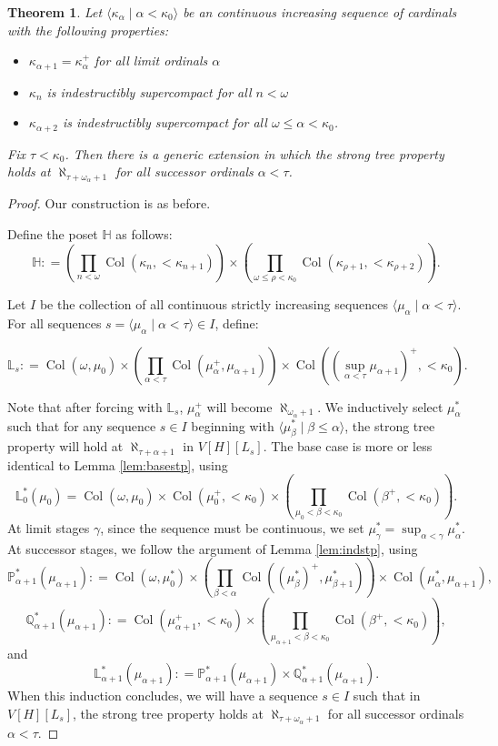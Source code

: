 \documentclass[psamsfonts]{amsart}
\newtheorem{thm}{Theorem}[section]
\theoremstyle{definition}
\newcommand{\defeq}{\mathrel{\mathop:}=}
\newcommand{\Q}{\mathbb{Q}}
\newcommand{\PP}{\mathbb{P}}
\newcommand{\LL}{\mathbb{L}}
\newcommand{\HH}{\mathbb{H}}
\newcommand{\ka}{\kappa}
\newcommand{\w}{\omega}
\DeclareMathOperator{\Coll}{Col}
\numberwithin{equation}{section}
\begin{document}
\begin{thm}
Let $\langle \ka_\alpha \mid \alpha < \ka_0\rangle$ be an continuous increasing sequence of cardinals with the following properties:
\begin{itemize}
	\item $\ka_{\alpha+1} = \ka_\alpha^+$ for all limit ordinals $\alpha$
	\item $\ka_n$ is indestructibly supercompact for all $n<\w$
	\item $\ka_{\alpha+2}$ is indestructibly supercompact for all $\w\leq \alpha < \ka_0$.
\end{itemize}

Fix $\tau < \ka_0$. Then there is a generic extension in which the strong tree property holds at $\aleph_{\tau+\w_\alpha+1}$ for all successor ordinals $\alpha < \tau$.
\end{thm}
\begin{proof}
	Our construction is as before.
	
	Define the poset $\HH$ as follows:
	\[\HH\defeq \left(\prod_{n<\w} \Coll(\ka_n, <\ka_{n+1})\right) \times \left( \prod_{\w\leq\rho<\ka_0} \Coll(\ka_{\rho+1}, <\ka_{\rho+2})\right).\]
	
	Let $I$ be the collection of all continuous strictly increasing sequences $\langle \mu_{\alpha} \mid \alpha < \tau\rangle$. For all sequences $s = \langle \mu_{\alpha} \mid \alpha < \tau\rangle\in I$, define:

	\[\LL_s \defeq \Coll(\w, \mu_0) \times \left( \prod_{\alpha < \tau } \Coll(\mu_{\alpha}^+, \mu_{\alpha+1})\right) \times \Coll((\sup_{\alpha < \tau} \mu_{\alpha+1})^+,<\ka_0).\]
	
	Note that after forcing with $\LL_s$, $\mu_\alpha^+$ will become $\aleph_{\w_\alpha+1}$.
	We inductively select $\mu^*_\alpha$ such that for any sequence $s\in I$ beginning with $\langle \mu^*_\beta \mid \beta \leq \alpha\rangle$, the strong tree property will hold at $\aleph_{\tau+\alpha+1}$ in $V[H][L_s]$.
	The base case is more or less identical to Lemma \ref{lem:basestp}, using 
	\[\LL^*_0(\mu_0) = \Coll(\w,\mu_0)\times \Coll(\mu_0^+, <\ka_0) \times \left(\prod_{\mu_0<\beta < \ka_0} \Coll(\beta^+, <\ka_0)\right).\]
	At limit stages $\gamma$, since the sequence must be continuous, we set $\mu^*_\gamma = \sup_{\alpha < \gamma} \mu^*_{\alpha}$.
	At successor stages, we follow the argument of Lemma \ref{lem:indstp}, using
	\[\PP^*_{\alpha+1}(\mu_{\alpha+1}) \defeq \Coll(\w, \mu_0^*)\times \left(\prod_{\beta < \alpha} \Coll((\mu^*_{\beta})^+, \mu^*_{\beta+1})\right)\times\Coll(\mu^*_{\alpha}, \mu_{\alpha+1}),\]
	\[\Q^*_{\alpha+1}(\mu_{\alpha+1}) \defeq \Coll(\mu_{\alpha+1}^+, <\ka_0) \times \left(\prod_{\mu_{\alpha+1} < \beta < \ka_0}\Coll(\beta^+, <\ka_0)\right),\]
	and
	\[\LL_{\alpha+1}^*(\mu_{\alpha+1})\defeq \PP^*_{\alpha+1}(\mu_{\alpha+1}) \times \Q^*_{\alpha+1}(\mu_{\alpha+1}).\]
	When this induction concludes, we will have a sequence $s\in I$ such that in $V[H][L_s]$, the strong tree property holds at $\aleph_{\tau+\w_{\alpha}+1}$ for all successor ordinals $\alpha < \tau$.
\end{proof}







\end{document}
